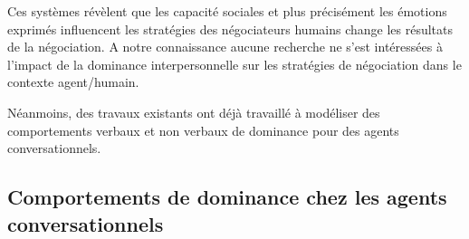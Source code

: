 	 Ces systèmes révèlent que les capacité sociales et plus précisément les émotions exprimés influencent les stratégies des négociateurs humains change les résultats de la négociation. A notre connaissance aucune recherche ne s'est intéressées à l'impact de la dominance interpersonnelle sur les stratégies de négociation dans le contexte agent/humain. 
	 
	 Néanmoins, des travaux existants ont déjà travaillé à modéliser des comportements verbaux et non verbaux de dominance pour des agents conversationnels. 
	 
	 \subsection{Comportements de dominance chez les agents conversationnels}
		
%	 
%	 
%	 
%	 
%	 
	 
	
	  
